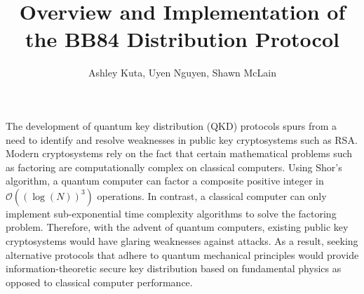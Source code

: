 \documentclass[12pt,a4paper]{article}
\title{Overview and Implementation of the BB84 Distribution Protocol}
\author{Ashley Kuta, Uyen Nguyen, Shawn McLain}
\begin{document}
 	\maketitle
 	
 	\paragraph{}
 	
 	The development of quantum key distribution (QKD) protocols spurs from a need to identify and resolve weaknesses in public key cryptosystems such as RSA. Modern cryptosystems rely on the fact that certain mathematical problems such as factoring are computationally complex on classical computers. Using Shor's algorithm, a quantum computer can factor a composite positive integer in $\mathcal{O}\left(\left(\log(N)\right)^3\right)$ operations. In contrast, a classical computer can only implement sub-exponential time complexity algorithms to solve the factoring problem. Therefore, with the advent of quantum computers, existing public key cryptosystems would have glaring weaknesses against attacks. As a result, seeking alternative protocols that adhere to quantum mechanical principles would provide information-theoretic secure key distribution based on fundamental physics as opposed to classical computer performance. %
 	
\end{document}
